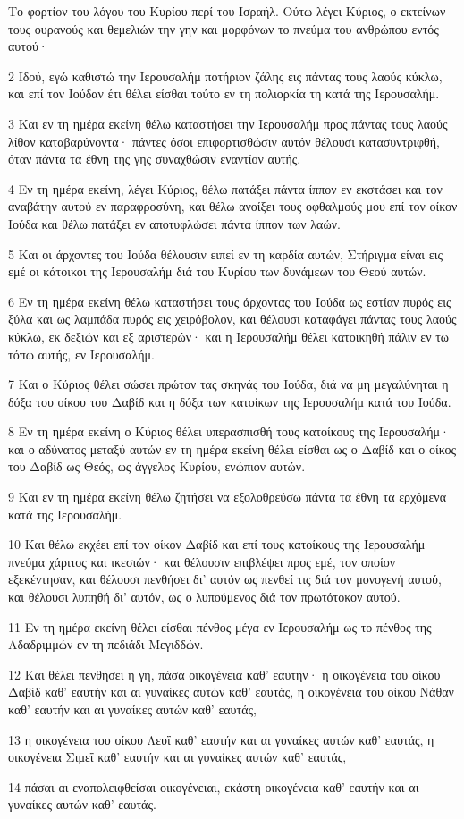 \par Το φορτίον του λόγου του Κυρίου περί του Ισραήλ. Ούτω λέγει Κύριος, ο εκτείνων τους ουρανούς και θεμελιών την γην και μορφόνων το πνεύμα του ανθρώπου εντός αυτού·
\par 2 Ιδού, εγώ καθιστώ την Ιερουσαλήμ ποτήριον ζάλης εις πάντας τους λαούς κύκλω, και επί τον Ιούδαν έτι θέλει είσθαι τούτο εν τη πολιορκία τη κατά της Ιερουσαλήμ.
\par 3 Και εν τη ημέρα εκείνη θέλω καταστήσει την Ιερουσαλήμ προς πάντας τους λαούς λίθον καταβαρύνοντα· πάντες όσοι επιφορτισθώσιν αυτόν θέλουσι κατασυντριφθή, όταν πάντα τα έθνη της γης συναχθώσιν εναντίον αυτής.
\par 4 Εν τη ημέρα εκείνη, λέγει Κύριος, θέλω πατάξει πάντα ίππον εν εκστάσει και τον αναβάτην αυτού εν παραφροσύνη, και θέλω ανοίξει τους οφθαλμούς μου επί τον οίκον Ιούδα και θέλω πατάξει εν αποτυφλώσει πάντα ίππον των λαών.
\par 5 Και οι άρχοντες του Ιούδα θέλουσιν ειπεί εν τη καρδία αυτών, Στήριγμα είναι εις εμέ οι κάτοικοι της Ιερουσαλήμ διά του Κυρίου των δυνάμεων του Θεού αυτών.
\par 6 Εν τη ημέρα εκείνη θέλω καταστήσει τους άρχοντας του Ιούδα ως εστίαν πυρός εις ξύλα και ως λαμπάδα πυρός εις χειρόβολον, και θέλουσι καταφάγει πάντας τους λαούς κύκλω, εκ δεξιών και εξ αριστερών· και η Ιερουσαλήμ θέλει κατοικηθή πάλιν εν τω τόπω αυτής, εν Ιερουσαλήμ.
\par 7 Και ο Κύριος θέλει σώσει πρώτον τας σκηνάς του Ιούδα, διά να μη μεγαλύνηται η δόξα του οίκου του Δαβίδ και η δόξα των κατοίκων της Ιερουσαλήμ κατά του Ιούδα.
\par 8 Εν τη ημέρα εκείνη ο Κύριος θέλει υπερασπισθή τους κατοίκους της Ιερουσαλήμ· και ο αδύνατος μεταξύ αυτών εν τη ημέρα εκείνη θέλει είσθαι ως ο Δαβίδ και ο οίκος του Δαβίδ ως Θεός, ως άγγελος Κυρίου, ενώπιον αυτών.
\par 9 Και εν τη ημέρα εκείνη θέλω ζητήσει να εξολοθρεύσω πάντα τα έθνη τα ερχόμενα κατά της Ιερουσαλήμ.
\par 10 Και θέλω εκχέει επί τον οίκον Δαβίδ και επί τους κατοίκους της Ιερουσαλήμ πνεύμα χάριτος και ικεσιών· και θέλουσιν επιβλέψει προς εμέ, τον οποίον εξεκέντησαν, και θέλουσι πενθήσει δι' αυτόν ως πενθεί τις διά τον μονογενή αυτού, και θέλουσι λυπηθή δι' αυτόν, ως ο λυπούμενος διά τον πρωτότοκον αυτού.
\par 11 Εν τη ημέρα εκείνη θέλει είσθαι πένθος μέγα εν Ιερουσαλήμ ως το πένθος της Αδαδριμμών εν τη πεδιάδι Μεγιδδών.
\par 12 Και θέλει πενθήσει η γη, πάσα οικογένεια καθ' εαυτήν· η οικογένεια του οίκου Δαβίδ καθ' εαυτήν και αι γυναίκες αυτών καθ' εαυτάς, η οικογένεια του οίκου Νάθαν καθ' εαυτήν και αι γυναίκες αυτών καθ' εαυτάς,
\par 13 η οικογένεια του οίκου Λευΐ καθ' εαυτήν και αι γυναίκες αυτών καθ' εαυτάς, η οικογένεια Σιμεΐ καθ' εαυτήν και αι γυναίκες αυτών καθ' εαυτάς,
\par 14 πάσαι αι εναπολειφθείσαι οικογένειαι, εκάστη οικογένεια καθ' εαυτήν και αι γυναίκες αυτών καθ' εαυτάς.

